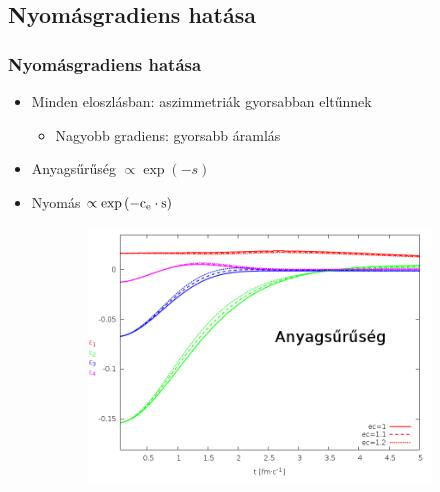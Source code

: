 \documentclass{beamer}
\begin{document}
\begin{frame}
\begin{center}
\begin{figure}[H]
\begin{subfigure}[b]{0.49\textwidth}
	\end{subfigure}
\end{figure}
\end{center}
\end{frame}

\subsection{Nyomásgradiens hatása}
\begin{frame}
\frametitle{Nyomásgradiens hatása}
\begin{center}
\begin{itemize}
\setlength{\itemsep}{12pt}
\item<1-> Minden eloszlásban: aszimmetriák gyorsabban eltűnnek
\begin{itemize}
\vspace{8pt}
\item<1-> Nagyobb gradiens: gyorsabb áramlás
\end{itemize}
\item<1-> Anyagsűrűség $\propto \exp{(-s)}$
\item<1-> Nyomás $\propto \exp{(-\rm{c_e}\cdot s)}$
\end{itemize}
\begin{figure}[H]
	\centering
    \begin{subfigure}[b]{0.49\textwidth}
    		\includegraphics[width=\textwidth]{pic/res/nonrel/eps_ec_r}
	\end{subfigure}
	\begin{subfigure}[b]{0.49\textwidth}

\end{subfigure}
\end{figure}
\end{center}
\end{frame}
\end{document}
